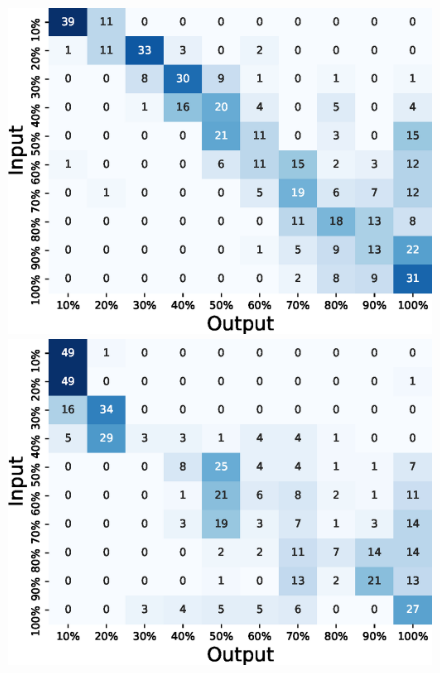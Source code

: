 \documentclass[manuscript,screen,review]{acmart}
\begin{document}
\begin{figure}[!t]
\begin{minipage}[t]{0.45\linewidth}
  \end{minipage}
  \begin{minipage}[t]{0.45\linewidth}
    \centering
    \includegraphics[width=0.9\linewidth]{figures/confusion_matrix_10_independent_shampoo.eps}
  \end{minipage}
  \begin{minipage}[t]{0.45\linewidth}
    \centering
    \includegraphics[width=0.9\linewidth]{figures/confusion_matrix_10_independent_skinmilk.eps}
  \end{minipage}
  \begin{minipage}[t]{0.45\linewidth}
    \centering

\end{minipage}
\end{figure}
\end{document}

